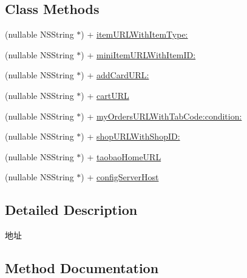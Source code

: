 \subsection*{Class Methods}
\begin{DoxyCompactItemize}
\item 
(nullable N\+S\+String $\ast$) + \mbox{\hyperlink{interface_alibc_trade_env_a1843b20070b3f79a1d105a6ce78099b2}{item\+U\+R\+L\+With\+Item\+Type\+:}}
\item 
(nullable N\+S\+String $\ast$) + \mbox{\hyperlink{interface_alibc_trade_env_a042a738d96c83da85cdb727071651ca2}{mini\+Item\+U\+R\+L\+With\+Item\+I\+D\+:}}
\item 
(nullable N\+S\+String $\ast$) + \mbox{\hyperlink{interface_alibc_trade_env_ad1f0721284d128cccff9d2b521cd12bf}{add\+Card\+U\+R\+L\+:}}
\item 
(nullable N\+S\+String $\ast$) + \mbox{\hyperlink{interface_alibc_trade_env_abcabe04de764fb86be28bb5eec720489}{cart\+U\+RL}}
\item 
(nullable N\+S\+String $\ast$) + \mbox{\hyperlink{interface_alibc_trade_env_ae80602a9aa1c6f08985628d1daa4aed9}{my\+Orders\+U\+R\+L\+With\+Tab\+Code\+:condition\+:}}
\item 
(nullable N\+S\+String $\ast$) + \mbox{\hyperlink{interface_alibc_trade_env_ac590d4f6d5686c93e042ed6c9f41fb82}{shop\+U\+R\+L\+With\+Shop\+I\+D\+:}}
\item 
(nullable N\+S\+String $\ast$) + \mbox{\hyperlink{interface_alibc_trade_env_a716e293787742d725d9d52cd525c56b0}{taobao\+Home\+U\+RL}}
\item 
(nullable N\+S\+String $\ast$) + \mbox{\hyperlink{interface_alibc_trade_env_ac1378bad7925be77052f5d5322470f78}{config\+Server\+Host}}
\end{DoxyCompactItemize}


\subsection{Detailed Description}
地址 

\subsection{Method Documentation}
\mbox{\label{interface_alibc_trade_env_ad1f0721284d128cccff9d2b521cd12bf}} 
